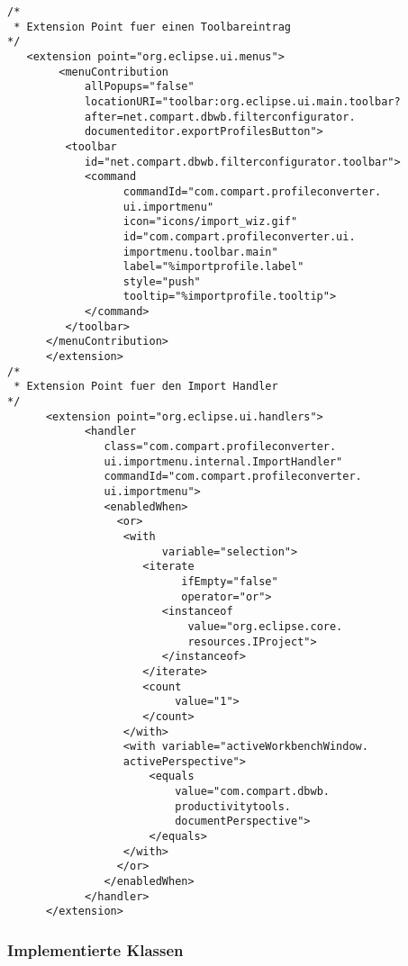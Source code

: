 {{{{ \begin{lstlisting}[caption={Exemplarische Extension Points für Toolbareintrag und Importhandler},label=lst:extension]
/*
 * Extension Point fuer einen Toolbareintrag 
*/    
   <extension point="org.eclipse.ui.menus">
		<menuContribution
            allPopups="false"
            locationURI="toolbar:org.eclipse.ui.main.toolbar?
            after=net.compart.dbwb.filterconfigurator.
            documenteditor.exportProfilesButton">
         <toolbar
            id="net.compart.dbwb.filterconfigurator.toolbar">
            <command
                  commandId="com.compart.profileconverter.
                  ui.importmenu"
                  icon="icons/import_wiz.gif"
                  id="com.compart.profileconverter.ui.
                  importmenu.toolbar.main"
                  label="%importprofile.label"
                  style="push"
                  tooltip="%importprofile.tooltip">
            </command>
         </toolbar>
      </menuContribution>
      </extension>
/*
 * Extension Point fuer den Import Handler 
*/       
      <extension point="org.eclipse.ui.handlers">
            <handler
               class="com.compart.profileconverter.
               ui.importmenu.internal.ImportHandler"
               commandId="com.compart.profileconverter.
               ui.importmenu">
               <enabledWhen>
                 <or> 
                  <with
                        variable="selection">
                     <iterate
                           ifEmpty="false"
                           operator="or">
                        <instanceof
                            value="org.eclipse.core.
                            resources.IProject">
                        </instanceof>
                     </iterate>
                     <count  
                          value="1">  
                     </count>
                  </with>
                  <with variable="activeWorkbenchWindow.
                  activePerspective">
                      <equals
                          value="com.compart.dbwb.
                          productivitytools.
                          documentPerspective">
                      </equals>
                  </with>
                 </or>
               </enabledWhen>
            </handler>
      </extension>
 \end{lstlisting}


}

\subsubsection{Implementierte Klassen}{
\label{sec:impl_klassen}

}}}}
